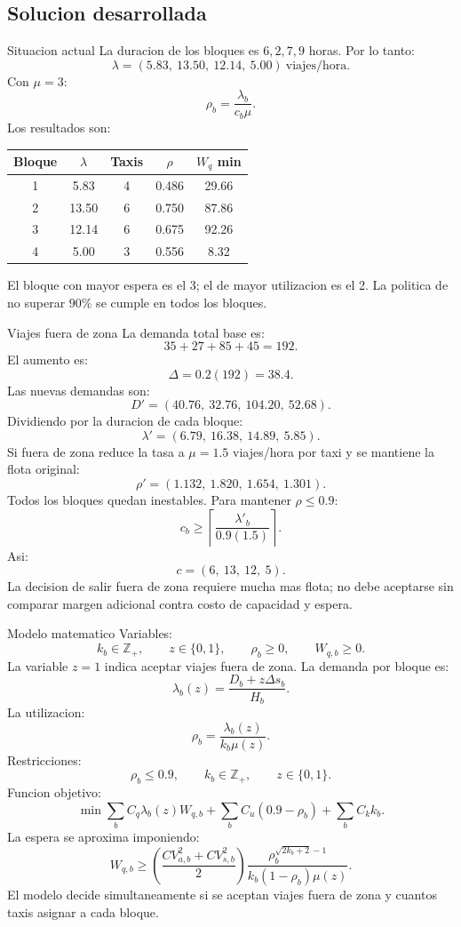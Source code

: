 \subsection{Solucion desarrollada}

\begin{respuesta}{Situacion actual}
La duracion de los bloques es \(6,2,7,9\) horas. Por lo tanto:
\[
\lambda=(5.83,\ 13.50,\ 12.14,\ 5.00)\ \text{viajes/hora}.
\]
Con \(\mu=3\):
\[
\rho_b=\frac{\lambda_b}{c_b\mu}.
\]
Los resultados son:
\begin{center}
\begin{tabular}{ccccc}
\toprule
Bloque & \(\lambda\) & Taxis & \(\rho\) & \(W_q\) min \\
\midrule
1 & 5.83 & 4 & 0.486 & 29.66 \\
2 & 13.50 & 6 & 0.750 & 87.86 \\
3 & 12.14 & 6 & 0.675 & 92.26 \\
4 & 5.00 & 3 & 0.556 & 8.32 \\
\bottomrule
\end{tabular}
\end{center}
El bloque con mayor espera es el 3; el de mayor utilizacion es el 2. La politica de no superar \(90\%\) se cumple en todos los bloques.
\end{respuesta}

\begin{respuesta}{Viajes fuera de zona}
La demanda total base es:
\[
35+27+85+45=192.
\]
El aumento es:
\[
\Delta=0.2(192)=38.4.
\]
Las nuevas demandas son:
\[
D'=(40.76,\ 32.76,\ 104.20,\ 52.68).
\]
Dividiendo por la duracion de cada bloque:
\[
\lambda'=(6.79,\ 16.38,\ 14.89,\ 5.85).
\]
Si fuera de zona reduce la tasa a \(\mu=1.5\) viajes/hora por taxi y se mantiene la flota original:
\[
\rho'=(1.132,\ 1.820,\ 1.654,\ 1.301).
\]
Todos los bloques quedan inestables. Para mantener \(\rho\le 0.9\):
\[
c_b\ge \left\lceil\frac{\lambda'_b}{0.9(1.5)}\right\rceil.
\]
Asi:
\[
c=(6,\ 13,\ 12,\ 5).
\]
La decision de salir fuera de zona requiere mucha mas flota; no debe aceptarse sin comparar margen adicional contra costo de capacidad y espera.
\end{respuesta}

\begin{respuesta}{Modelo matematico}
Variables:
\[
k_b\in\mathbb{Z}_+,\qquad z\in\{0,1\},\qquad \rho_b\ge 0,\qquad W_{q,b}\ge 0.
\]
La variable \(z=1\) indica aceptar viajes fuera de zona. La demanda por bloque es:
\[
\lambda_b(z)=\frac{D_b+z\Delta s_b}{H_b}.
\]
La utilizacion:
\[
\rho_b=\frac{\lambda_b(z)}{k_b\mu(z)}.
\]
Restricciones:
\[
\rho_b\le 0.9,\qquad k_b\in\mathbb{Z}_+,\qquad z\in\{0,1\}.
\]
Funcion objetivo:
\[
\min \sum_b C_q\lambda_b(z)W_{q,b}
+\sum_b C_u(0.9-\rho_b)
+\sum_b C_k k_b.
\]
La espera se aproxima imponiendo:
\[
W_{q,b}\ge
\left(\frac{CV_{a,b}^2+CV_{s,b}^2}{2}\right)
\frac{\rho_b^{\sqrt{2k_b+2}-1}}{k_b(1-\rho_b)\mu(z)}.
\]
El modelo decide simultaneamente si se aceptan viajes fuera de zona y cuantos taxis asignar a cada bloque.
\end{respuesta}
